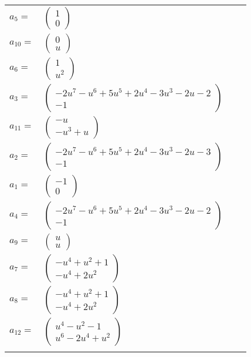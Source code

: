 \documentclass[1p]{elsarticle_modified}
\theoremstyle{definition}
\begin{document}
\begin{tabular}{m{7pt} m{180pt} m{7pt} m{180pt} }
\flushright $a_{5}=$&$\begin{pmatrix}1\\0\end{pmatrix}$ \\
\flushright $a_{10}=$&$\begin{pmatrix}0\\u\end{pmatrix}$ \\
\flushright $a_{6}=$&$\begin{pmatrix}1\\u^2\end{pmatrix}$ \\
\flushright $a_{3}=$&$\begin{pmatrix}-2 u^7- u^6+5 u^5+2 u^4-3 u^3-2 u-2\\-1\end{pmatrix}$ \\
\flushright $a_{11}=$&$\begin{pmatrix}- u\\- u^3+u\end{pmatrix}$ \\
\flushright $a_{2}=$&$\begin{pmatrix}-2 u^7- u^6+5 u^5+2 u^4-3 u^3-2 u-3\\-1\end{pmatrix}$ \\
\flushright $a_{1}=$&$\begin{pmatrix}-1\\0\end{pmatrix}$ \\
\flushright $a_{4}=$&$\begin{pmatrix}-2 u^7- u^6+5 u^5+2 u^4-3 u^3-2 u-2\\-1\end{pmatrix}$ \\
\flushright $a_{9}=$&$\begin{pmatrix}u\\u\end{pmatrix}$ \\
\flushright $a_{7}=$&$\begin{pmatrix}- u^4+u^2+1\\- u^4+2 u^2\end{pmatrix}$ \\
\flushright $a_{8}=$&$\begin{pmatrix}- u^4+u^2+1\\- u^4+2 u^2\end{pmatrix}$ \\
\flushright $a_{12}=$&$\begin{pmatrix}u^4- u^2-1\\u^6-2 u^4+u^2\end{pmatrix}$\\&\end{tabular}
\end{document}
